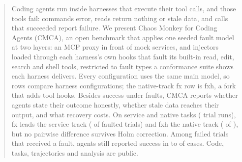 \begin{abstract}
Coding agents run inside harnesses that execute their tool calls, and those tools fail: commands error, reads return nothing or stale data, and calls that succeeded report failure.
We present Chaos Monkey for Coding Agents (CMCA), an open benchmark that applies one seeded fault model at two layers: an MCP proxy in front of mock services, and injectors loaded through each harness's own hooks that fault its built-in read, edit, search and shell tools, restricted to fault types a conformance suite shows each harness delivers.
Every configuration uses the same main model, so rows compare harness configurations; the native-track fx row is fxh, a fork that adds tool hooks.
Besides success under faults, CMCA reports whether agents state their outcome honestly, whether stale data reaches their output, and what recovery costs.
\ifcmcaresults
On \cmcaTrackSTasks{} service and \cmcaTrackNFixedTasks{} native tasks (\cmcaTrialDirs{} trial runs), fx leads the service track (\cmcaTrackSLeaderSucceeded{} of \cmcaTrackSLeaderSent{} faulted trials) and fxh the native track (\cmcaTrackNFixedLeaderSucceeded{} of \cmcaTrackNFixedLeaderSent{}), but no pairwise difference survives Holm correction.
Among failed trials that received a fault, agents still reported success in \cmcaOverclaimPctMin{} to \cmcaOverclaimPctMax{} of cases.
\fi
Code, tasks, trajectories and analysis are public.
\end{abstract}
